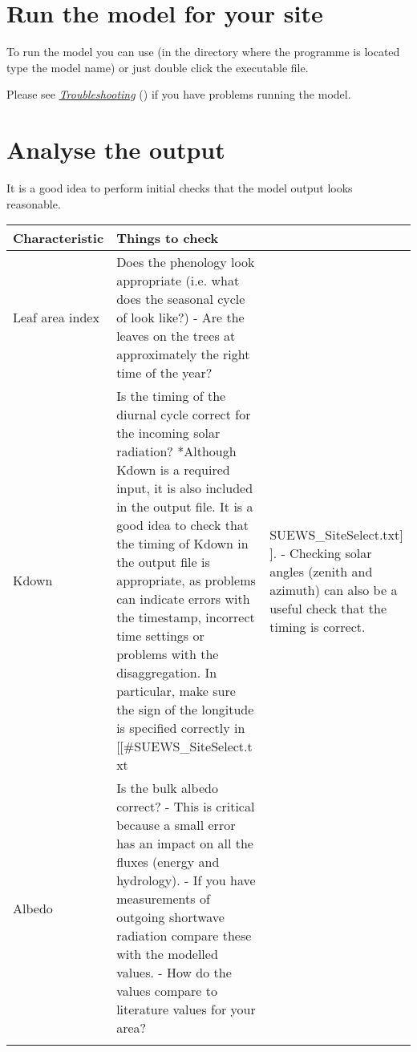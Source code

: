 \documentclass[letterpaper,10pt,english]{sphinxmanual}
\begin{document}
\section{Run the model for your site}
\label{\detokenize{prepare-to-run-the-model:run-the-model-for-your-site}}
To run the model you can use  (in the directory where
the programme is located type the model name) or just double click the
executable file.

Please see {\hyperref[\detokenize{prepare-to-run-the-model:Troubleshooting}]{\emph{Troubleshooting}}} () if you have problems
running the model.


\section{Analyse the output}
\label{\detokenize{prepare-to-run-the-model:analyse-the-output}}
It is a good idea to perform initial checks that the model output looks
reasonable.


\begin{savenotes}\sphinxattablestart
\centering
\begin{tabulary}{\linewidth}[t]{|T|T|T|}
\hline
\sphinxstyletheadfamily 
Characteristic
&\sphinxstyletheadfamily 
Things to check
&\sphinxstyletheadfamily \\
\hline
Leaf area index
&
Does the phenology
look appropriate
(i.e. what does the
seasonal cycle of
look like?)
-  Are the leaves on
the trees at
approximately the
right time of the
year?
&\\
\hline
Kdown
&
Is the timing of the
diurnal cycle correct
for the incoming
solar radiation?
*Although Kdown is a
required input, it is
also included in the
output file. It is a
good idea to check
that the timing of
Kdown in the output
file is appropriate,
as problems can
indicate errors with
the timestamp,
incorrect time
settings or problems
with the
disaggregation. In
particular, make sure
the sign of the
longitude is
specified correctly
in
{[}{[}\#SUEWS\_SiteSelect.t
xt
&
SUEWS\_SiteSelect.txt{]}
{]}.
-  Checking solar
angles (zenith and
azimuth) can also
be a useful check
that the timing is
correct.
\\
\hline
Albedo
&
Is the bulk albedo
correct?
-  This is critical
because a small
error has an
impact on all the
fluxes (energy and
hydrology).
-  If you have
measurements of
outgoing shortwave
radiation compare
these with the
modelled values.
-  How do the values
compare to
literature values
for your area?
&\\
\hline&&\\
\hline
\end{tabulary}
\par
\sphinxattableend\end{savenotes}
\end{document}
